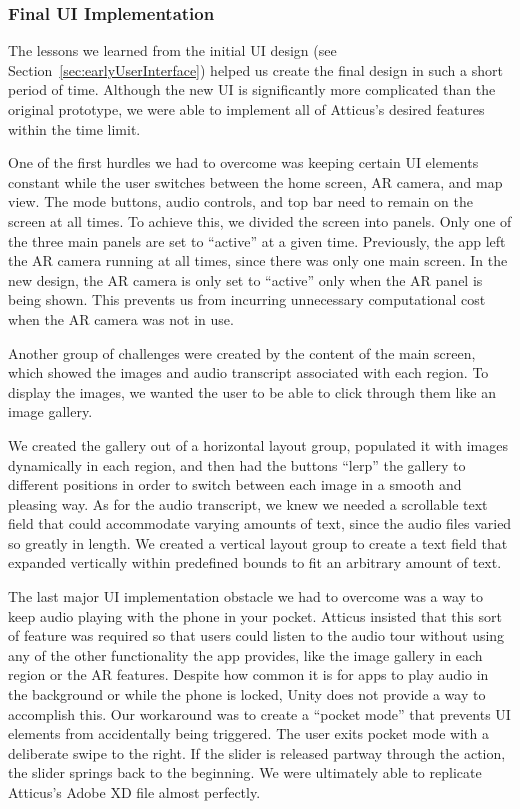 \documentclass[a4paper, 10pt, american, titlepage]{article}
\begin{document}
\subsubsection{Final UI Implementation}
\label{sec:finalUI}

The lessons we learned from the initial UI design (see
Section~\ref{sec:earlyUserInterface}) helped us create the final design in such
a short period of time. Although the new UI is significantly more complicated
than the original prototype, we were able to implement all of Atticus's desired
features within the time limit.

One of the first hurdles we had to overcome was keeping certain UI elements
constant while the user switches between the home screen, AR camera, and map
view. The mode buttons, audio controls, and top bar need to remain on the screen
at all times. To achieve this, we divided the screen into panels. Only one of
the three main panels are set to ``active'' at a given time. Previously, the app
left the AR camera running at all times, since there was only one main screen.
In the new design, the AR camera is only set to ``active'' only when the AR
panel is being shown. This prevents us from incurring unnecessary computational
cost when the AR camera was not in use.

Another group of challenges were created by the content of the main screen,
which showed the images and audio transcript associated with each region. To
display the images, we wanted the user to be able to click through them like
an image gallery.

We created the gallery out of a horizontal layout group, populated it with
images dynamically in each region, and then had the buttons ``lerp'' the gallery
to different positions in order to switch between each image in a smooth and
pleasing way. As for the audio transcript, we knew we needed a scrollable text
field that could accommodate varying amounts of text, since the audio files
varied so greatly in length. We created a vertical layout group to create a text
field that expanded vertically within predefined bounds to fit an arbitrary
amount of text.

The last major UI implementation obstacle we had to overcome was a way to keep
audio playing with the phone in your pocket. Atticus insisted that this sort of
feature was required so that users could listen to the audio tour without using
any of the other functionality the app provides, like the image gallery in each
region or the AR features. Despite how common it is for apps to play audio in
the background or while the phone is locked, Unity does not provide a way to
accomplish this. Our workaround was to create a ``pocket mode'' that prevents UI
elements from accidentally being triggered. The user exits pocket mode with a
deliberate swipe to the right. If the slider is released partway through the
action, the slider springs back to the beginning. We were ultimately able to
replicate Atticus's Adobe XD file almost perfectly.
\end{document}
